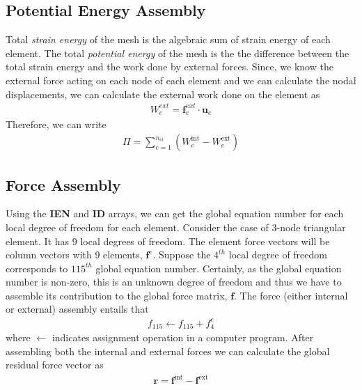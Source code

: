 \documentclass[../main.tex]{subfiles}
\begin{document}
\subsection{Potential Energy Assembly}
Total \textit{strain energy} of the mesh is the algebraic sum of
strain energy of each element. The total \textit{potential energy} of
the mesh is the the difference between the total strain energy and the
work done by external forces. Since, we know the external force acting
on each node of each element and we can calculate the nodal
displacements, we can calculate the external work done on the element
as
\begin{align*}
  W^{ext}_e = \mathbf{f}^{ext}_e\cdot\mathbf{u}_e
\end{align*}
Therefore, we can write
\begin{align*}
  \Pi = \sum^{n_{el}}_{e=1}(W^{\text{int}}_e - W^{\text{ext}}_e)
\end{align*}
\subsection{Force Assembly}
Using the \textbf{IEN} and \textbf{ID} arrays, we can get the global
equation number for each local degree of freedom for each
element. Consider the case of 3-node triangular element. It has 9
local degrees of freedom. The element force vectors will be column
vectors with 9 elements, $\mathbf{f}^e$. Suppose the $4^{th}$ local
degree of freedom corresponds to $115^{th}$ global equation
number. Certainly, as the global equation number is non-zero, this is
an unknown degree of freedom and thus we have to assemble its
contribution to the global force matrix, $\mathbf{f}$. The force
(either internal or external) assembly entails that
\begin{align*}
  f_{115} \leftarrow f_{115} + f^{e}_4
\end{align*}
where $\leftarrow$ indicates assignment operation in a computer
program. After assembling both the internal and external forces we can
calculate the global residual force vector as
\begin{align*}
  \mathbf{r} = \mathbf{f}^{\text{int}} - \mathbf{f}^{\text{ext}}
\end{align*}
\end{document}
